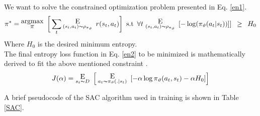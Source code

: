 \begin{enumerate}[label={\alph*)}]
    We want to solve the constrained optimization problem presented in Eq. \ref{en1}.
    \begin{equation}
        \pi^* = \substack{\mathlarger{\text{argmax}} \\ \mathlarger{\pi}} \hspace{5pt}  \bigg[ \sum_{t} \substack{\mathlarger{\text{E}} \\(s_{t}, a_{t}) \thicksim \rho_{\pi_{\vartheta}}}\hspace{5pt} r(s_{t}, a_{t}) \bigg]\hspace{5pt} \text{s.t}\hspace{5pt} \forall t\hspace{3pt} \substack{\mathlarger{\text{E}} \\ (s_{t}, a_{t}) \thicksim \rho_{\pi_{\vartheta}}}\hspace{5pt} [-\log(\pi_{\vartheta}(a_{t}|s_{t}))]]\hspace{5pt} \geq\hspace{5pt } H_{0}
        \label{en1}
    \end{equation}
    Where $H_{0}$ is the desired minimum entropy.\\
    
    The final entropy loss function in Eq. \ref{en2} to be minimized is mathematically derived to fit the above mentioned constraint \cite{haarnoja2019soft}.
    \begin{equation}
        J(\alpha) = \substack{\mathlarger{\text{E}} \\ s_{t} \thicksim D}\hspace{5pt} \Big[\hspace{2pt}\substack{\mathlarger{\text{E}} \\ a_{t} \thicksim \pi_{\vartheta}(.|s_{t})}\hspace{5pt} [-\alpha \log \pi_{\vartheta} (a_{t}, s_{t}) - \alpha H_{0}] \Big]
        \label{en2}
    \end{equation}
    \end{enumerate}
A brief pseudocode of the SAC algorithm used in training is shown in Table \ref{SAC}.
    
